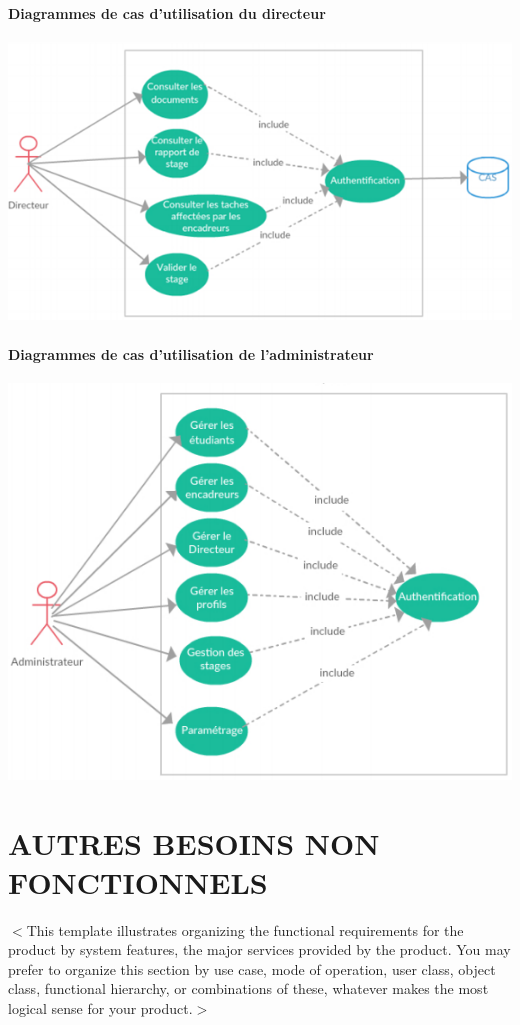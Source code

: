 \documentclass{scrreprt}
\begin{document}
\subsubsection{Diagrammes de cas d'utilisation du directeur}
\begin{center}
	\includegraphics[scale=0.55]{image/casutilisationdudirecteur.png}
\end{center}
\subsubsection{Diagrammes de cas d'utilisation de l'administrateur}
\begin{center}
	\includegraphics[scale=0.55]{image/casutilisationdeadministrateur.png}
\end{center}


\chapter{AUTRES BESOINS NON FONCTIONNELS}
$<$This template illustrates organizing the functional requirements for the 
product by system features, the major services provided by the product. You may 
prefer to organize this section by use case, mode of operation, user class, 
object class, functional hierarchy, or combinations of these, whatever makes the 
most logical sense for your product.$>$
\end{document}
